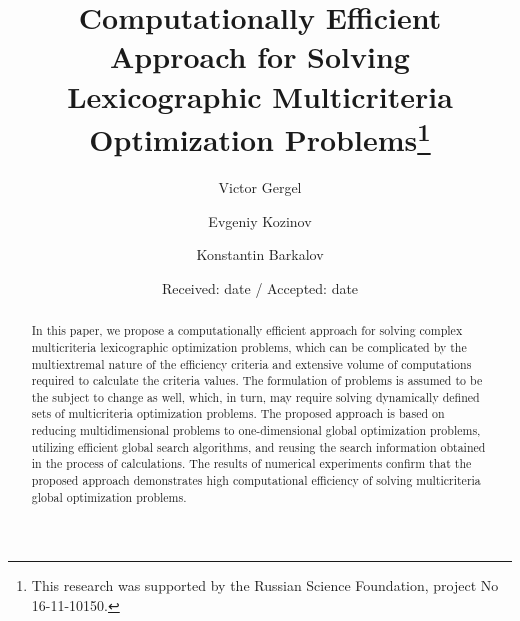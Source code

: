 \documentclass[smallextended]{svjour3}       %
\begin{document}
\title{Computationally Efficient Approach for Solving Lexicographic Multicriteria Optimization Problems\thanks{This research was supported by the Russian Science Foundation, project No 16-11-10150. %
}
}


\author{Victor Gergel %
\and
Evgeniy Kozinov
\and
Konstantin Barkalov
}



\date{Received: date / Accepted: date}

\maketitle

\begin{abstract}
In this paper, we propose a computationally efficient approach for solving complex multicriteria lexicographic optimization problems, which can be complicated by the multiextremal nature of the efficiency criteria and extensive volume of computations required to calculate the criteria values. The formulation of problems is assumed to be the subject to change as well, which, in turn, may require solving dynamically defined sets of multicriteria optimization problems. The proposed approach is based on reducing multidimensional problems to one-dimensional global optimization problems, utilizing efficient global search algorithms, and reusing the search information obtained in the process of calculations. The results of numerical experiments confirm that the proposed approach demonstrates high computational efficiency of solving multicriteria global optimization problems.
\end{abstract}
\end{document}
